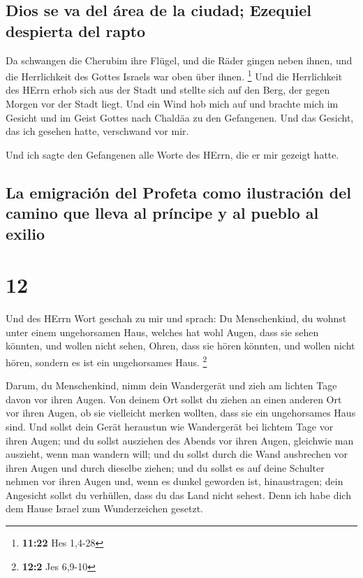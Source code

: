 \hypertarget{dios-se-va-del-uxe1rea-de-la-ciudad-ezequiel-despierta-del-rapto}{%
\subsection{Dios se va del área de la ciudad; Ezequiel despierta del
rapto}\label{dios-se-va-del-uxe1rea-de-la-ciudad-ezequiel-despierta-del-rapto}}

 Da schwangen die Cherubim ihre Flügel, und die Räder
gingen neben ihnen, und die Herrlichkeit des Gottes Israels war oben
über ihnen. \footnote{\textbf{11:22} Hes 1,4-28}  Und die
Herrlichkeit des HErrn erhob sich aus der Stadt und stellte sich auf den
Berg, der gegen Morgen vor der Stadt liegt.  Und ein Wind
hob mich auf und brachte mich im Gesicht und im Geist Gottes nach
Chaldäa zu den Gefangenen. Und das Gesicht, das ich gesehen hatte,
verschwand vor mir.

 Und ich sagte den Gefangenen alle Worte des HErrn, die
er mir gezeigt hatte.

\hypertarget{la-emigraciuxf3n-del-profeta-como-ilustraciuxf3n-del-camino-que-lleva-al-pruxedncipe-y-al-pueblo-al-exilio}{%
\subsection{La emigración del Profeta como ilustración del camino que
lleva al príncipe y al pueblo al
exilio}\label{la-emigraciuxf3n-del-profeta-como-ilustraciuxf3n-del-camino-que-lleva-al-pruxedncipe-y-al-pueblo-al-exilio}}

\hypertarget{section-11}{%
\section{12}\label{section-11}}

 Und des HErrn Wort geschah zu mir und sprach:
 Du Menschenkind, du wohnst unter einem ungehorsamen Haus,
welches hat wohl Augen, dass sie sehen könnten, und wollen nicht sehen,
Ohren, dass sie hören könnten, und wollen nicht hören, sondern es ist
ein ungehorsames Haus. \footnote{\textbf{12:2} Jes 6,9-10}

 Darum, du Menschenkind, nimm dein Wandergerät und zieh am
lichten Tage davon vor ihren Augen. Von deinem Ort sollst du ziehen an
einen anderen Ort vor ihren Augen, ob sie vielleicht merken wollten,
dass sie ein ungehorsames Haus sind.  Und sollst dein
Gerät heraustun wie Wandergerät bei lichtem Tage vor ihren Augen; und du
sollst ausziehen des Abends vor ihren Augen, gleichwie man auszieht,
wenn man wandern will;  und du sollst durch die Wand
ausbrechen vor ihren Augen und durch dieselbe ziehen;  und
du sollst es auf deine Schulter nehmen vor ihren Augen und, wenn es
dunkel geworden ist, hinaustragen; dein Angesicht sollst du verhüllen,
dass du das Land nicht sehest. Denn ich habe dich dem Hause Israel zum
Wunderzeichen gesetzt.

